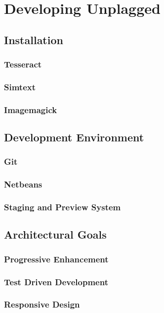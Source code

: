 \chapter{Developing Unplagged}\label{chap:developingUnplagged}

\section{Installation}
\subsection{Tesseract}
\subsection{Simtext}
\subsection{Imagemagick}

\section{Development Environment}

\subsection{Git}
\subsection{Netbeans}
\subsection{Staging and Preview System}

\section{Architectural Goals}

\subsection{Progressive Enhancement}

\subsection{Test Driven Development}

\subsection{Responsive Design}